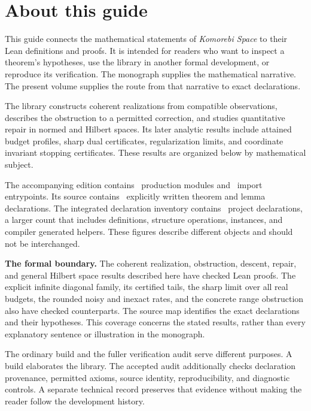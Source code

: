 \documentclass[11pt]{article}
\begin{document}
\KomorebiCover

\section*{About this guide}
This guide connects the mathematical statements of \emph{Komorebi Space} to their Lean definitions and proofs. It is intended for readers who want to inspect a theorem's hypotheses, use the library in another formal development, or reproduce its verification. The monograph supplies the mathematical narrative. The present volume supplies the route from that narrative to exact declarations.

The library constructs coherent realizations from compatible observations, describes the obstruction to a permitted correction, and studies quantitative repair in normed and Hilbert spaces. Its later analytic results include attained budget profiles, sharp dual certificates, regularization limits, and coordinate invariant stopping certificates. These results are organized below by mathematical subject.

The accompanying edition contains \EditionProductionModules\ production modules and \EditionEntrypoints\ import entrypoints. Its source contains \EditionExplicitTheorems\ explicitly written theorem and lemma declarations. The integrated declaration inventory contains \EditionExportedDeclarations\ project declarations, a larger count that includes definitions, structure operations, instances, and compiler generated helpers. These figures describe different objects and should not be interchanged.

\begin{scopebox}
\textbf{The formal boundary.} The coherent realization, obstruction, descent, repair, and general Hilbert space results described here have checked Lean proofs. The explicit infinite diagonal family, its certified tails, the sharp limit over all real budgets, the rounded noisy and inexact rates, and the concrete range obstruction also have checked counterparts. The source map identifies the exact declarations and their hypotheses. This coverage concerns the stated results, rather than every explanatory sentence or illustration in the monograph.
\end{scopebox}

The ordinary build and the fuller verification audit serve different purposes. A build elaborates the library. The accepted audit additionally checks declaration provenance, permitted axioms, source identity, reproducibility, and diagnostic controls. A separate technical record preserves that evidence without making the reader follow the development history.
\end{document}
